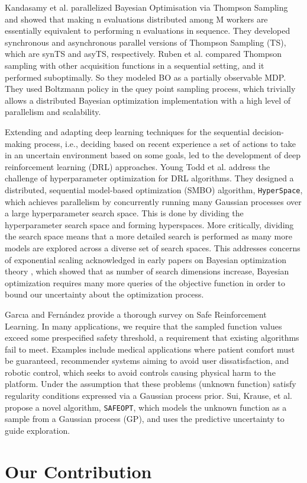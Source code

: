 Kandasamy et al.\cite{pmlr-v84-kandasamy18a} parallelized Bayesian Optimisation via Thompson Sampling and showed that making n evaluations distributed among M workers are essentially equivalent to performing n evaluations in sequence. 
They developed synchronous and asynchronous parallel versions of Thompson Sampling (TS), which are synTS and asyTS, respectively.
Ruben et al.\cite{Ruben.distr.bo} compared Thompson sampling with other acquisition functions in a sequential setting, and it performed suboptimally. So they modeled BO as a partially observable MDP. They used Boltzmann policy in the quey point sampling process, which trivially allows a distributed Bayesian optimization implementation with a high level of parallelism and scalability.

Extending and adapting deep learning techniques for the sequential decision-making process, i.e., deciding based on recent experience a set of actions to take in an uncertain environment based on some goals, led to the development of deep reinforcement learning (DRL) approaches. 
Young Todd et al.\cite{conf/sbac-pad/YoungHRK18} address the challenge of hyperparameter optimization for DRL algorithms. They designed a distributed, sequential model-based optimization (SMBO) algorithm, \texttt{HyperSpace}, which achieves parallelism by concurrently running many Gaussian processes over a large hyperparameter search space. 
This is done by dividing the hyperparameter search space and forming hyperspaces. 
More critically, dividing the search space means that a more detailed search is performed as many more models are explored across a diverse set of search spaces. 
This addresses concerns of exponential scaling acknowledged in early papers on Bayesian optimization theory \cite{pmlr-v9-grunewalder10a} \cite{Srinivas_2012}, which showed that as number of search dimensions increase, Bayesian optimization requires many more queries of the objective function in order to bound our uncertainty about the optimization process.

Garcıa and Fernández \cite{garcia15a} provide a thorough survey on Safe Reinforcement Learning. 
In many applications, we require that the sampled function values exceed some prespecified safety threshold, a requirement that existing algorithms fail to meet. 
Examples include medical applications where patient comfort must be guaranteed, recommender systems aiming to avoid user dissatisfaction, and robotic control, which seeks to avoid controls causing physical harm to the platform. 
Under the assumption that these problems (unknown function) satisfy regularity conditions expressed via a Gaussian process prior. 
Sui, Krause, et al.\cite{conf/icml/SuiGBK15} propose a novel algorithm, \texttt{SAFEOPT}, which models the unknown function as a sample from a Gaussian process (GP), and uses the predictive uncertainty to guide exploration.

\section{Our Contribution}
\label{sec:our-contribution}


